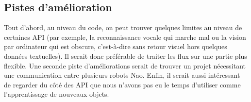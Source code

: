 \documentclass{article}
\begin{document}
\subsection{Pistes d'amélioration}

Tout d'abord, au niveau du code, on peut trouver quelques limites au niveau de certaines API (par exemple, la reconnaissance vocale qui marche mal ou la vision par ordinateur qui est obscure, c'est-à-dire sans retour visuel hors quelques données textuelles). Il serait donc préférable de traiter les flux sur une partie plus flexible.
Une seconde piste d'améliorations serait de trouver un projet nécessitant une communication entre plusieurs robots Nao.
Enfin, il serait aussi intéressant de regarder du côté des API que nous n'avons pas eu le temps d'utiliser comme l'apprentissage de nouveaux objets.
\end{document}

